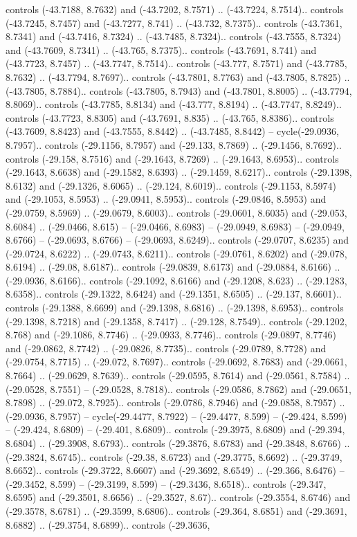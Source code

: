 \begin{scope}[shift={(2.5552, 9.9912)}]
\begin{scope}[shift={(48.1654, -14.8546)}]
controls (-43.7188, 8.7632) and (-43.7202, 8.7571) .. (-43.7224, 8.7514).. controls (-43.7245, 8.7457) and (-43.7277, 8.741) .. (-43.732, 8.7375).. controls (-43.7361, 8.7341) and (-43.7416, 8.7324) .. (-43.7485, 8.7324).. controls (-43.7555, 8.7324) and (-43.7609, 8.7341) .. (-43.765, 8.7375).. controls (-43.7691, 8.741) and (-43.7723, 8.7457) .. (-43.7747, 8.7514).. controls (-43.777, 8.7571) and (-43.7785, 8.7632) .. (-43.7794, 8.7697).. controls (-43.7801, 8.7763) and (-43.7805, 8.7825) .. (-43.7805, 8.7884).. controls (-43.7805, 8.7943) and (-43.7801, 8.8005) .. (-43.7794, 8.8069).. controls (-43.7785, 8.8134) and (-43.777, 8.8194) .. (-43.7747, 8.8249).. controls (-43.7723, 8.8305) and (-43.7691, 8.835) .. (-43.765, 8.8386).. controls (-43.7609, 8.8423) and (-43.7555, 8.8442) .. (-43.7485, 8.8442) -- cycle(-29.0936, 8.7957).. controls (-29.1156, 8.7957) and (-29.133, 8.7869) .. (-29.1456, 8.7692).. controls (-29.158, 8.7516) and (-29.1643, 8.7269) .. (-29.1643, 8.6953).. controls (-29.1643, 8.6638) and (-29.1582, 8.6393) .. (-29.1459, 8.6217).. controls (-29.1398, 8.6132) and (-29.1326, 8.6065) .. (-29.124, 8.6019).. controls (-29.1153, 8.5974) and (-29.1053, 8.5953) .. (-29.0941, 8.5953).. controls (-29.0846, 8.5953) and (-29.0759, 8.5969) .. (-29.0679, 8.6003).. controls (-29.0601, 8.6035) and (-29.053, 8.6084) .. (-29.0466, 8.615) -- (-29.0466, 8.6983) -- (-29.0949, 8.6983) -- (-29.0949, 8.6766) -- (-29.0693, 8.6766) -- (-29.0693, 8.6249).. controls (-29.0707, 8.6235) and (-29.0724, 8.6222) .. (-29.0743, 8.6211).. controls (-29.0761, 8.6202) and (-29.078, 8.6194) .. (-29.08, 8.6187).. controls (-29.0839, 8.6173) and (-29.0884, 8.6166) .. (-29.0936, 8.6166).. controls (-29.1092, 8.6166) and (-29.1208, 8.623) .. (-29.1283, 8.6358).. controls (-29.1322, 8.6424) and (-29.1351, 8.6505) .. (-29.137, 8.6601).. controls (-29.1388, 8.6699) and (-29.1398, 8.6816) .. (-29.1398, 8.6953).. controls (-29.1398, 8.7218) and (-29.1358, 8.7417) .. (-29.128, 8.7549).. controls (-29.1202, 8.768) and (-29.1086, 8.7746) .. (-29.0933, 8.7746).. controls (-29.0897, 8.7746) and (-29.0862, 8.7742) .. (-29.0826, 8.7735).. controls (-29.0789, 8.7728) and (-29.0754, 8.7715) .. (-29.072, 8.7697).. controls (-29.0692, 8.7683) and (-29.0661, 8.7664) .. (-29.0629, 8.7639).. controls (-29.0595, 8.7614) and (-29.0561, 8.7584) .. (-29.0528, 8.7551) -- (-29.0528, 8.7818).. controls (-29.0586, 8.7862) and (-29.0651, 8.7898) .. (-29.072, 8.7925).. controls (-29.0786, 8.7946) and (-29.0858, 8.7957) .. (-29.0936, 8.7957) -- cycle(-29.4477, 8.7922) -- (-29.4477, 8.599) -- (-29.424, 8.599) -- (-29.424, 8.6809) -- (-29.401, 8.6809).. controls (-29.3975, 8.6809) and (-29.394, 8.6804) .. (-29.3908, 8.6793).. controls (-29.3876, 8.6783) and (-29.3848, 8.6766) .. (-29.3824, 8.6745).. controls (-29.38, 8.6723) and (-29.3775, 8.6692) .. (-29.3749, 8.6652).. controls (-29.3722, 8.6607) and (-29.3692, 8.6549) .. (-29.366, 8.6476) -- (-29.3452, 8.599) -- (-29.3199, 8.599) -- (-29.3436, 8.6518).. controls (-29.347, 8.6595) and (-29.3501, 8.6656) .. (-29.3527, 8.67).. controls (-29.3554, 8.6746) and (-29.3578, 8.6781) .. (-29.3599, 8.6806).. controls (-29.364, 8.6851) and (-29.3691, 8.6882) .. (-29.3754, 8.6899).. controls (-29.3636, 
\end{scope}
\end{scope}
